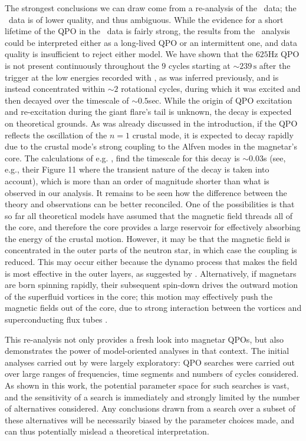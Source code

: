 \documentclass{emulateapj}
\begin{document}
The strongest conclusions we can draw come from a re-analysis of the \rxte\ data; the \rhessi\ data is of lower quality, and thus ambiguous. While the evidence for a short lifetime of the QPO in the \rxte\ data is fairly strong, the results from the \rhessi\ analysis could be interpreted either as a long-lived QPO or an intermittent one, and data quality is insufficient to reject either model.
 We have shown that the $625$Hz QPO is not present continuously throughout the $9$ cycles starting at $\sim 239 \, \mathrm{s}$ after the trigger at the low energies recorded with \rxte, as was inferred previously, and is instead concentrated within $\sim 2$ rotational cycles, during which it was excited and then decayed over the timescale
of $\sim 0.5$sec. While the origin of QPO excitation and re-excitation during the giant flare's tail is unknown, the
decay is expected on theoretical grounds. As was already discussed in the introduction, if the QPO reflects the oscillation of the $n=1$ crustal mode, it is expected to decay rapidly due to the crustal mode's strong coupling to the Alfven modes
in the magnetar's core. The calculations of e.g. \citet{vanHoven12}, find the timescale for this decay is $\sim 0.03$s (see, e.g., their Figure 11 where the transient nature of the decay is taken into account), which is more than an order of magnitude shorter than what is observed in our analysis. It remains to be seen how the difference between the theory and observations can be better reconciled. One of the possibilities is that so far 
all theoretical models have assumed that the magnetic field threads all of the core, and therefore the core provides a large reservoir for effectively absorbing the energy of the crustal motion. However, it may be that the magnetic field is concentrated in the outer parts of the neutron star, in which case the coupling is reduced. This may occur either because the dynamo process that makes the field is most effective in
the outer layers, as suggested by \citet{bonanno2006}. Alternatively, if magnetars are born spinning rapidly, their subsequent spin-down drives the outward motion of the superfluid vortices in the core; this motion may effectively push the magnetic fields out of the core, due to strong interaction between the vortices and superconducting flux tubes \citep{ruderman1998}.

This re-analysis not only provides a fresh look into magnetar QPOs, but also demonstrates the power of model-oriented analyses in that context. The initial analyses carried out by \citet{Israel05,Strohmayer05,Strohmayer06,Watts06} were largely exploratory: QPO searches were carried out over large ranges of frequencies, time segments and numbers of cycles considered. As shown in this work, the potential parameter space for such searches is vast, and the sensitivity of a search is immediately and strongly limited by the number of alternatives considered. Any conclusions drawn from a search over a subset of these alternatives will be necessarily biased by the parameter choices made, and can thus potentially mislead a theoretical interpretation.
\end{document}
